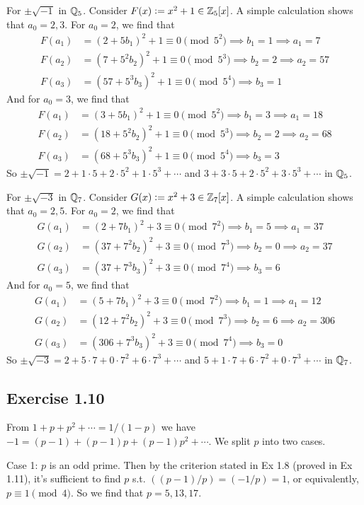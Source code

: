 \documentclass[../Koblitz.tex]{subfiles}
\begin{document}
For $\pm\sqrt{-1}$ in $\mathbb{Q}_5$. Consider $F(x):=x^2+1\in\mathbb{Z}_5[x]$. A simple calculation shows that $a_0=2,3$. For $a_0=2$, we find that
\begin{align*}
F(a_1)&=(2+5b_1)^2+1\equiv 0\pmod{5^2} \implies b_1=1 \implies a_1=7 \\
F(a_2)&=(7+5^2b_2)^2+1\equiv 0\pmod{5^3} \implies b_2=2 \implies a_2=57 \\
F(a_3)&=(57+5^3b_3)^2+1\equiv 0\pmod{5^4} \implies b_3=1
\end{align*}
And for $a_0=3$, we find that
\begin{align*}
F(a_1)&=(3+5b_1)^2+1\equiv 0\pmod{5^2} \implies b_1=3 \implies a_1=18 \\
F(a_2)&=(18+5^2b_2)^2+1\equiv 0\pmod{5^3} \implies b_2=2 \implies a_2=68 \\
F(a_3)&=(68+5^3b_3)^2+1\equiv 0\pmod{5^4} \implies b_3=3
\end{align*}
So $\pm\sqrt{-1}=2+1\cdot5+2\cdot5^2+1\cdot5^3+\cdots$ and $3+3\cdot5+2\cdot5^2+3\cdot5^3+\cdots$ in $\mathbb{Q}_5$.

For $\pm\sqrt{-3}$ in $\mathbb{Q}_7$. Consider $G(x):=x^2+3\in\mathbb{Z}_7[x]$. A simple calculation shows that $a_0=2,5$. For $a_0=2$, we find that
\begin{align*}
G(a_1)&=(2+7b_1)^2+3\equiv 0\pmod{7^2} \implies b_1=5 \implies a_1=37 \\
G(a_2)&=(37+7^2b_2)^2+3\equiv 0\pmod{7^3} \implies b_2=0 \implies a_2=37\\
G(a_3)&=(37+7^3b_3)^2+3\equiv 0\pmod{7^4} \implies b_3=6
\end{align*}
And for $a_0=5$, we find that
\begin{align*}
G(a_1)&=(5+7b_1)^2+3\equiv 0\pmod{7^2} \implies b_1=1 \implies a_1=12 \\
G(a_2)&=(12+7^2b_2)^2+3\equiv 0\pmod{7^3} \implies b_2=6 \implies a_2=306 \\
G(a_3)&=(306+7^3b_3)^2+3\equiv 0\pmod{7^4} \implies b_3=0
\end{align*}
So $\pm\sqrt{-3}=2+5\cdot7+0\cdot7^2+6\cdot7^3+\cdots$ and $5+1\cdot7+6\cdot7^2+0\cdot7^3+\cdots$ in $\mathbb{Q}_7$.


\subsection*{Exercise 1.10}

From $1+p+p^2+\cdots=1/(1-p)$ we have $-1=(p-1)+(p-1)p+(p-1)p^2+\cdots$. We split $p$ into two cases.

Case 1: $p$ is an odd prime. Then by the criterion stated in Ex 1.8 (proved in Ex 1.11), it's sufficient to find $p$ s.t. $((p-1)/p)=(-1/p)=1$, or equivalently, $p\equiv1\pmod{4}$. So we find that $p=5,13,17$.
\end{document}
